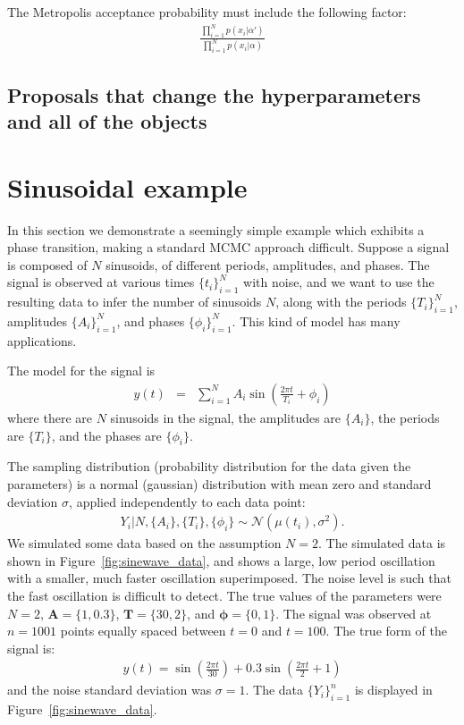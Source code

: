 \documentclass[letterpaper, 11pt]{article}
\begin{document}
The Metropolis acceptance probability must include the following factor:
\begin{eqnarray}
\frac{\prod_{i=1}^N p(x_i | \alpha')}{\prod_{i=1}^N p(x_i | \alpha)}
\end{eqnarray}

\subsection{Proposals that change the hyperparameters and all of the objects}

\section{Sinusoidal example}
In this section we demonstrate a seemingly simple example which exhibits
a phase transition, making a standard MCMC approach difficult. Suppose
a signal is composed of $N$ sinusoids, of different periods, amplitudes,
and phases. The signal is observed at various times $\{t_i\}_{i=1}^N$ with
noise, and we want to use the resulting data to infer the number of sinusoids
$N$, along with the periods $\{T_i\}_{i=1}^N$, amplitudes $\{A_i\}_{i=1}^N$,
and phases $\{\phi_i\}_{i=1}^N$.
This kind of model has many applications\citep[see e.g.][]{bretthorst}.

The model for the signal is
\begin{eqnarray}
y(t) &=& \sum_{i=1}^N A_i \sin \left(\frac{2\pi t}{T_i} + \phi_i\right)
\end{eqnarray}
where there are $N$ sinusoids in the signal, the
amplitudes are $\{A_i\}$, the periods are $\{T_i\}$, and the phases are
$\{\phi_i\}$.

The sampling distribution (probability distribution for the data given the
parameters) is a normal (gaussian) distribution with mean zero and standard
deviation $\sigma$, applied independently to each data point:
\begin{eqnarray}
Y_i | N, \{A_i\}, \{T_i\}, \{\phi_i\} \sim
\mathcal{N}\left(\mu(t_i), \sigma^2\right).
\end{eqnarray}
We simulated some data based on the assumption $N=2$.
The simulated data is shown in Figure~\ref{fig:sinewave_data}, and shows a
large, low period oscillation with a smaller, much faster oscillation
superimposed. The noise level is such that the fast oscillation is difficult
to detect. The true values of the parameters were
$N=2$, $\mathbf{A} = \{1, 0.3\}$,
$\mathbf{T}=\{30, 2\}$, and $\boldsymbol{\phi} = \{0, 1\}$. The signal was
observed at $n=1001$ points equally spaced between $t=0$ and $t=100$.
The true form of the signal is:
\begin{eqnarray}
y(t) = \sin\left(\frac{2\pi t}{30}\right) +
0.3 \sin\left(\frac{2\pi t}{2} + 1\right)
\end{eqnarray}
and the noise standard deviation was $\sigma = 1$. The data $\{Y_i\}_{i=1}^n$
is displayed in Figure~\ref{fig:sinewave_data}.
\end{document}
